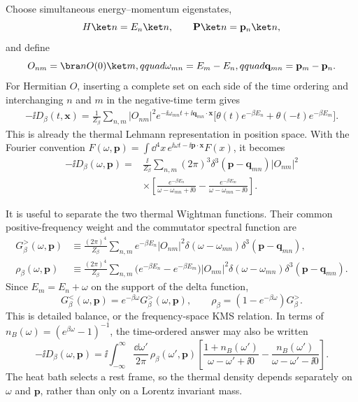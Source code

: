 \begin{enumerate}
Choose simultaneous energy--momentum eigenstates,
\[
 H\ket n=E_n\ket n,
 \qquad \mathbf P\ket n=\mathbf p_n\ket n,
\]
and define
\[
 O_{nm}=\bra nO(0)\ket m,qquad
 \omega_{mn}=E_m-E_n,qquad
 \mathbf q_{mn}=\mathbf p_m-\mathbf p_n.
\]
For Hermitian \(O\), inserting a complete set on each side of the time
ordering and interchanging \(n\) and \(m\) in the negative-time term gives
\[
 \begin{split}
 -\ii D_\beta(t,\mathbf x)
 =\frac1{Z_\beta}\sum_{n,m}|O_{nm}|^2
 e^{-\ii\omega_{mn}t+\ii\mathbf q_{mn}\cdot\mathbf x}
 \bigl[\theta(t)e^{-\beta E_n}
 +\theta(-t)e^{-\beta E_m}\bigr].
 \end{split}
\]
This is already the thermal Lehmann representation in position space.
With the Fourier convention
\(F(\omega,\mathbf p)=\int \dd^4x\,
e^{\ii\omega t-\ii\mathbf p\cdot\mathbf x}F(x)\), it becomes
\[
 \begin{split}
 -\ii D_\beta(\omega,\mathbf p)
 ={}&\frac{\ii}{Z_\beta}\sum_{n,m}(2\pi)^3
 \delta^3(\mathbf p-\mathbf q_{mn})|O_{nm}|^2\\
 &\times\left[
 \frac{e^{-\beta E_n}}{\omega-\omega_{mn}+\ii0}
 -\frac{e^{-\beta E_m}}{\omega-\omega_{mn}-\ii0}
 \right].
 \end{split}
\]

It is useful to separate the two thermal Wightman functions.  Their common
positive-frequency weight and the commutator spectral function are
\[
 \begin{split}
 G_\beta^>(\omega,\mathbf p)
 &\equiv\frac{(2\pi)^4}{Z_\beta}\sum_{n,m}e^{-\beta E_n}
 |O_{nm}|^2\delta(\omega-\omega_{mn})
 \delta^3(\mathbf p-\mathbf q_{mn}),\\
 \rho_\beta(\omega,\mathbf p)
 &\equiv\frac{(2\pi)^4}{Z_\beta}\sum_{n,m}
 \bigl(e^{-\beta E_n}-e^{-\beta E_m}\bigr)|O_{nm}|^2
 \delta(\omega-\omega_{mn})
 \delta^3(\mathbf p-\mathbf q_{mn}).
 \end{split}
\]
Since \(E_m=E_n+\omega\) on the support of the delta function,
\[
 G_\beta^<(\omega,\mathbf p)
 =e^{-\beta\omega}G_\beta^>(\omega,\mathbf p),
 \qquad
 \rho_\beta=(1-e^{-\beta\omega})G_\beta^>.
\]
This is detailed balance, or the frequency-space KMS relation.  In terms of
\(n_B(\omega)=(e^{\beta\omega}-1)^{-1}\), the time-ordered answer may also
be written
\[
 -\ii D_\beta(\omega,\mathbf p)
 =\ii\int_{-\infty}^{\infty}\frac{\dd\omega'}{2\pi}\,
 \rho_\beta(\omega',\mathbf p)
 \left[
 \frac{1+n_B(\omega')}{\omega-\omega'+\ii0}
 -\frac{n_B(\omega')}{\omega-\omega'-\ii0}
 \right].
\]
The heat bath selects a rest frame, so the thermal density depends
separately on \(\omega\) and \(\mathbf p\), rather than only on a Lorentz
invariant mass.


\end{enumerate}
